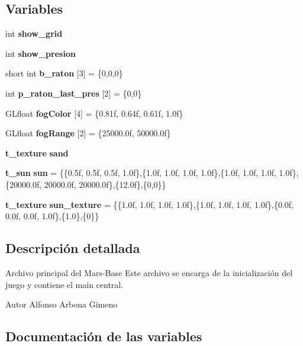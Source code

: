 \subsection*{Variables}
\begin{DoxyCompactItemize}
\item 
int {\bfseries show\_\-grid}\label{main_8c_a649b3c48c39dfcaeb3764b5a33535bd7}

\item 
int {\bfseries show\_\-presion}\label{main_8c_af4c758d3daac127140a86e5abb8c8f43}

\item 
short int {\bfseries b\_\-raton} [3] = \{0,0,0\}\label{main_8c_ac1d9dedec4f6d075343d17e546f3e391}

\item 
int {\bfseries p\_\-raton\_\-last\_\-pres} [2] = \{0,0\}\label{main_8c_a27f8eacfb01de5ffb476981df65fd7c8}

\item 
GLfloat {\bf fogColor} [4] = \{0.81f, 0.64f, 0.61f, 1.0f\}
\item 
GLfloat {\bf fogRange} [2] = \{25000.0f, 50000.0f\}
\item 
{\bf t\_\-texture} {\bfseries sand}\label{main_8c_ab7b35883b12fe06f42688d93a36f685c}

\item 
{\bf t\_\-sun} {\bfseries sun} = \{\{0.5f, 0.5f, 0.5f, 1.0f\},\{1.0f, 1.0f, 1.0f, 1.0f\},\{1.0f, 1.0f, 1.0f, 1.0f\},\{20000.0f, 20000.0f, 20000.0f\},\{12.0f\},\{0,0\}\}\label{main_8c_ac724115b4c0bb518e7ab1e1a9b15815f}

\item 
{\bf t\_\-texture} {\bfseries sun\_\-texture} = \{\{1.0f, 1.0f, 1.0f, 1.0f\},\{1.0f, 1.0f, 1.0f, 1.0f\},\{0.0f, 0.0f, 0.0f, 1.0f\},\{1.0\},\{0\}\}\label{main_8c_a8e9f03e85c74742e4ef03cc131e73109}

\end{DoxyCompactItemize}


\subsection{Descripción detallada}
Archivo principal del Mars-\/Base Este archivo se encarga de la inicialización del juego y contiene el main central. \begin{DoxyAuthor}{Autor}
Alfonso Arbona Gimeno 
\end{DoxyAuthor}


\subsection{Documentación de las variables}
